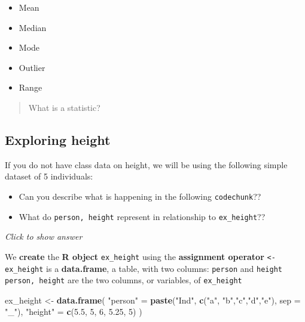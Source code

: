 \documentclass[
]{book}
\newenvironment{Shaded}{\begin{snugshade}}{\end{snugshade}}
\newcommand{\AttributeTok}[1]{\textcolor[rgb]{0.13,0.29,0.53}{#1}}
\newcommand{\DecValTok}[1]{\textcolor[rgb]{0.00,0.00,0.81}{#1}}
\newcommand{\FloatTok}[1]{\textcolor[rgb]{0.00,0.00,0.81}{#1}}
\newcommand{\FunctionTok}[1]{\textcolor[rgb]{0.13,0.29,0.53}{\textbf{#1}}}
\newcommand{\NormalTok}[1]{#1}
\newcommand{\OtherTok}[1]{\textcolor[rgb]{0.56,0.35,0.01}{#1}}
\newcommand{\StringTok}[1]{\textcolor[rgb]{0.31,0.60,0.02}{#1}}
\providecommand{\tightlist}{%
  \setlength{\itemsep}{0pt}\setlength{\parskip}{0pt}}
\begin{document}
\begin{itemize}
\tightlist
\item
  Mean
\item
  Median
\item
  Mode
\item
  Outlier
\item
  Range
\end{itemize}

\begin{quote}
What is a statistic?
\end{quote}

\hypertarget{exploring-height}{%
\subsection{Exploring height}\label{exploring-height}}

If you do not have class data on height, we will be using the following simple dataset of 5 individuals:

\begin{itemize}
\tightlist
\item
  Can you describe what is happening in the following \texttt{codechunk}??
\item
  What do \texttt{person,\ height} represent in relationship to \texttt{ex\_height}??
\end{itemize}

\emph{Click to show answer}

We \textbf{create} the \textbf{R object} \texttt{ex\_height} using the \textbf{assignment operator} \texttt{\textless{}-}
\texttt{ex\_height} is a \textbf{data.frame}, a table, with two columns: \texttt{person} and \texttt{height}
\texttt{person,\ height} are the two columns, or variables, of \texttt{ex\_height}

\begin{Shaded}
\begin{Highlighting}[]
\NormalTok{ex\_height }\OtherTok{\textless{}{-}} \FunctionTok{data.frame}\NormalTok{(}
  \StringTok{"person"} \OtherTok{=} \FunctionTok{paste}\NormalTok{(}\StringTok{"Ind"}\NormalTok{, }
                   \FunctionTok{c}\NormalTok{(}\StringTok{"a"}\NormalTok{, }\StringTok{"b"}\NormalTok{,}\StringTok{"c"}\NormalTok{,}\StringTok{"d"}\NormalTok{,}\StringTok{"e"}\NormalTok{), }
                   \AttributeTok{sep =} \StringTok{"\_"}\NormalTok{),}
  \StringTok{"height"} \OtherTok{=} \FunctionTok{c}\NormalTok{(}\FloatTok{5.5}\NormalTok{, }\DecValTok{5}\NormalTok{, }\DecValTok{6}\NormalTok{, }\FloatTok{5.25}\NormalTok{, }\DecValTok{5}\NormalTok{)}
\NormalTok{)}
\end{Highlighting}
\end{Shaded}
\end{document}
